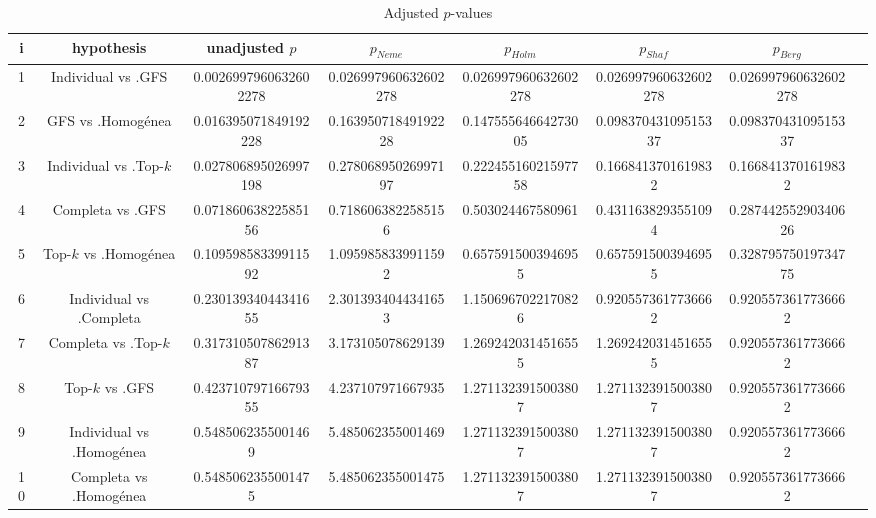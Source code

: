 \documentclass[a4paper,10pt]{article}
\begin{document}
\begin{landscape}
\begin{table}[!htp]
\centering\tiny
\caption{Adjusted $p$-values}
\begin{tabular}{cccccccc}
i&hypothesis&unadjusted $p$&$p_{Neme}$&$p_{Holm}$&$p_{Shaf}$&$p_{Berg}$\\
\hline
1&Individual vs .GFS&0.0026997960632602278&0.026997960632602278&0.026997960632602278&0.026997960632602278&0.026997960632602278\\
2&GFS vs .Homogénea&0.016395071849192228&0.16395071849192228&0.14755564664273005&0.09837043109515337&0.09837043109515337\\
3&Individual vs .Top-$k$&0.027806895026997198&0.27806895026997197&0.22245516021597758&0.1668413701619832&0.1668413701619832\\
4&Completa vs .GFS&0.07186063822585156&0.7186063822585156&0.503024467580961&0.4311638293551094&0.28744255290340626\\
5&Top-$k$ vs .Homogénea&0.10959858339911592&1.0959858339911592&0.6575915003946955&0.6575915003946955&0.32879575019734775\\
6&Individual vs .Completa&0.23013934044341655&2.3013934044341653&1.1506967022170826&0.9205573617736662&0.9205573617736662\\
7&Completa vs .Top-$k$&0.31731050786291387&3.173105078629139&1.2692420314516555&1.2692420314516555&0.9205573617736662\\
8&Top-$k$ vs .GFS&0.42371079716679355&4.237107971667935&1.2711323915003807&1.2711323915003807&0.9205573617736662\\
9&Individual vs .Homogénea&0.5485062355001469&5.485062355001469&1.2711323915003807&1.2711323915003807&0.9205573617736662\\
10&Completa vs .Homogénea&0.5485062355001475&5.485062355001475&1.2711323915003807&1.2711323915003807&0.9205573617736662\\
\hline
\end{tabular}
\end{table}

\end{landscape}
\end{document}

